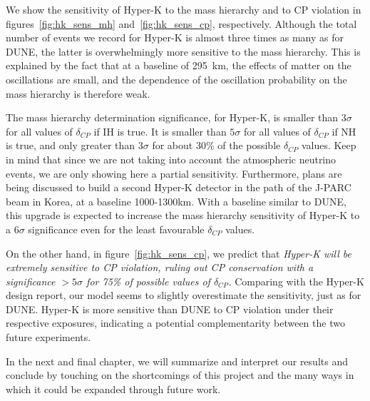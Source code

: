 We show the sensitivity of Hyper-K to the mass hierarchy and to CP violation in
figures~\ref{fig:hk_sens_mh} and~\ref{fig:hk_sens_cp}, respectively.
Although the total number of events we record for Hyper-K is almost three times
as many as for DUNE, the latter is overwhelmingly more sensitive to the mass
hierarchy. This is explained by the fact that at a baseline of \SI{295}{\km},
the effects of matter on the oscillations are small, and the dependence of the
oscillation probability on the mass hierarchy is therefore weak. 

The mass hierarchy determination significance, for Hyper-K, is smaller than
$3\sigma$ for all values of $\delta_{CP}$ if IH is true. It is smaller than
$5\sigma$ for all values of $\delta_{CP}$ if NH is true, and only greater than
$3\sigma$ for about 30\% of the possible $\delta_{CP}$ values.
Keep in mind that since we are not taking into account the atmospheric
neutrino events, we are only showing here a partial sensitivity. 
Furthermore, plans are being discussed\cite{t2hkk} to build a second Hyper-K detector in
the path of the J-PARC beam in Korea, at a baseline 1000-1300\si{\km}.
With a baseline similar to DUNE, this upgrade is expected to increase the mass
hierarchy sensitivity of Hyper-K to a $6\sigma$ significance even for the least
favourable $\delta_{CP}$ values.

On the other hand, in figure~\ref{fig:hk_sens_cp}, we predict that
\emph{Hyper-K will be extremely sensitive to CP violation, ruling out CP
conservation with a significance $>5\sigma$ for 75\% of possible values of
$\delta_{CP}$.}
Comparing with the Hyper-K design report, our model seems to slightly overestimate the
sensitivity, just as for DUNE. Hyper-K is more sensitive than
DUNE to CP violation under their respective exposures, indicating a potential
complementarity between the two future experiments.

In the next and final chapter, we will summarize and interpret our results and
conclude by touching on the shortcomings of this project and the many ways in
which it could be expanded through future work.






